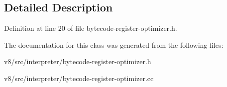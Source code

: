 \subsection{Detailed Description}


Definition at line 20 of file bytecode-\/register-\/optimizer.\+h.



The documentation for this class was generated from the following files\+:\begin{DoxyCompactItemize}
\item 
v8/src/interpreter/bytecode-\/register-\/optimizer.\+h\item 
v8/src/interpreter/bytecode-\/register-\/optimizer.\+cc\end{DoxyCompactItemize}
